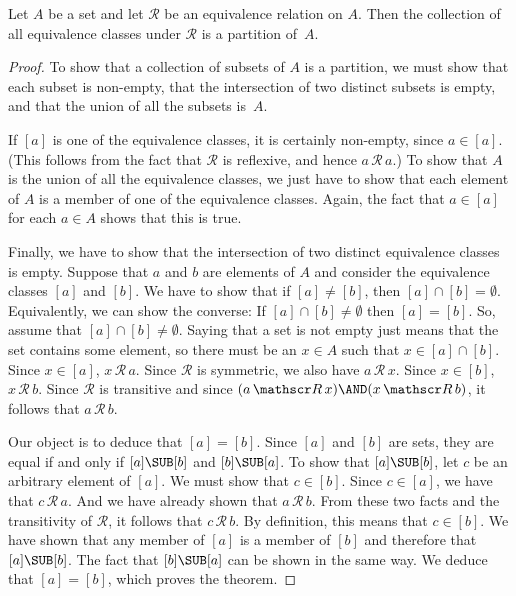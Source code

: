 \begin{theorem}\label{T-partition}
Let $A$ be a set and let $\mathscr R$ be an equivalence relation
on $A$.  Then the collection of all equivalence classes under
$\mathscr R$ is a partition of~$A$.
\end{theorem}
\begin{proof}
To show that a collection of subsets of $A$ is a partition, we
must show that each subset is non-empty, that the intersection
of two distinct subsets is empty, and that the union of all the
subsets is~$A$.

If $[a]$ is one of the equivalence classes, it is certainly
non-empty, since $a\in[a]$.  (This follows from the fact that
$\mathscr R$ is reflexive, and hence $a\,{\mathscr R}\,a$.)
To show that $A$ is the union of
all the equivalence classes, we just have to show that each
element of $A$ is a member of one of the equivalence classes.
Again, the fact that $a\in[a]$ for each $a\in A$ shows that this
is true.

Finally, we have to show that the intersection of two distinct
equivalence classes is empty.  Suppose that $a$ and $b$ are elements
of $A$ and consider the equivalence classes $[a]$ and $[b]$.
We have to show that if $[a]\not=[b]$, then $[a]\cap[b]=\emptyset$.
Equivalently, we can show the converse:  If $[a]\cap[b]\not=\emptyset$
then $[a]=[b]$.  So, assume that $[a]\cap[b]\not=\emptyset$.
Saying that a set is not empty just means that the set contains some
element, so there must be an $x\in A$ such that $x\in[a]\cap[b]$.
Since $x\in[a]$, $x\,{\mathscr R}\,a$.  Since $\mathscr R$ is symmetric,
we also have $a\,{\mathscr R}\,x$.  Since $x\in[b]$, $x\,{\mathscr R}\,b$.
Since $\mathscr R$ is transitive and since $(a\,{\mathscr R}\,x)\AND (x\,{\mathscr R}\,b)$,
it follows that $a\,{\mathscr R}\,b$.

Our object is to deduce that $[a]=[b]$.  Since $[a]$ and $[b]$
are sets, they are equal if and only if $[a]\SUB[b]$ and
$[b]\SUB[a]$.  To show that $[a]\SUB[b]$, let $c$ be an arbitrary
element of $[a]$.  We must show that $c\in[b]$.  Since
$c\in[a]$, we have that $c\,{\mathscr R}\,a$.  And we have already shown
that $a\,{\mathscr R}\,b$.  From these two facts and the transitivity
of $\mathscr R$, it follows that $c\,{\mathscr R}\,b$.  By
definition, this means that $c\in[b]$.  We have shown that
any member of $[a]$ is a member of $[b]$ and therefore that
$[a]\SUB[b]$.  The fact that $[b]\SUB[a]$ can be shown in the
same way.  We deduce that $[a]=[b]$, which proves the theorem.
\end{proof}


